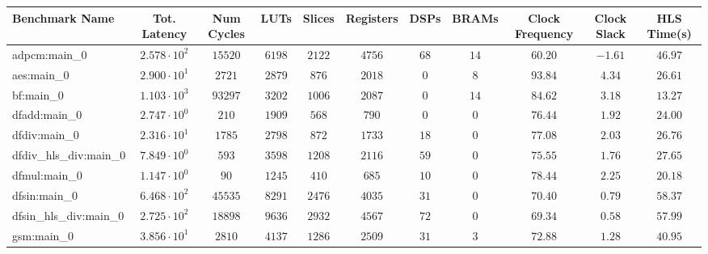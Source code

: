 \begin{tabular}{|l|c|c|c|c|c|c|c|c|c|c|}
\hline
Benchmark Name          & Tot. Latency           & Num Cycles & LUTs      & Slices    & Registers & DSPs    & BRAMs   & Clock Frequency & Clock Slack & HLS Time(s) \\
\hline
adpcm:main\_0           & $ 2.578 \cdot 10^{2} $ & $ 15520  $ & $ 6198  $ & $ 2122  $ & $ 4756  $ & $ 68  $ & $ 14  $ & $ 60.20       $ & $ -1.61   $ & $ 46.97   $ \\
aes:main\_0             & $ 2.900 \cdot 10^{1} $ & $ 2721   $ & $ 2879  $ & $ 876   $ & $ 2018  $ & $ 0   $ & $ 8   $ & $ 93.84       $ & $ 4.34    $ & $ 26.61   $ \\
bf:main\_0              & $ 1.103 \cdot 10^{3} $ & $ 93297  $ & $ 3202  $ & $ 1006  $ & $ 2087  $ & $ 0   $ & $ 14  $ & $ 84.62       $ & $ 3.18    $ & $ 13.27   $ \\
dfadd:main\_0           & $ 2.747 \cdot 10^{0} $ & $ 210    $ & $ 1909  $ & $ 568   $ & $ 790   $ & $ 0   $ & $ 0   $ & $ 76.44       $ & $ 1.92    $ & $ 24.00   $ \\
dfdiv:main\_0           & $ 2.316 \cdot 10^{1} $ & $ 1785   $ & $ 2798  $ & $ 872   $ & $ 1733  $ & $ 18  $ & $ 0   $ & $ 77.08       $ & $ 2.03    $ & $ 26.76   $ \\
dfdiv\_hls\_div:main\_0 & $ 7.849 \cdot 10^{0} $ & $ 593    $ & $ 3598  $ & $ 1208  $ & $ 2116  $ & $ 59  $ & $ 0   $ & $ 75.55       $ & $ 1.76    $ & $ 27.65   $ \\
dfmul:main\_0           & $ 1.147 \cdot 10^{0} $ & $ 90     $ & $ 1245  $ & $ 410   $ & $ 685   $ & $ 10  $ & $ 0   $ & $ 78.44       $ & $ 2.25    $ & $ 20.18   $ \\
dfsin:main\_0           & $ 6.468 \cdot 10^{2} $ & $ 45535  $ & $ 8291  $ & $ 2476  $ & $ 4035  $ & $ 31  $ & $ 0   $ & $ 70.40       $ & $ 0.79    $ & $ 58.37   $ \\
dfsin\_hls\_div:main\_0 & $ 2.725 \cdot 10^{2} $ & $ 18898  $ & $ 9636  $ & $ 2932  $ & $ 4567  $ & $ 72  $ & $ 0   $ & $ 69.34       $ & $ 0.58    $ & $ 57.99   $ \\
gsm:main\_0             & $ 3.856 \cdot 10^{1} $ & $ 2810   $ & $ 4137  $ & $ 1286  $ & $ 2509  $ & $ 31  $ & $ 3   $ & $ 72.88       $ & $ 1.28    $ & $ 40.95   $ \\

\end{tabular}
